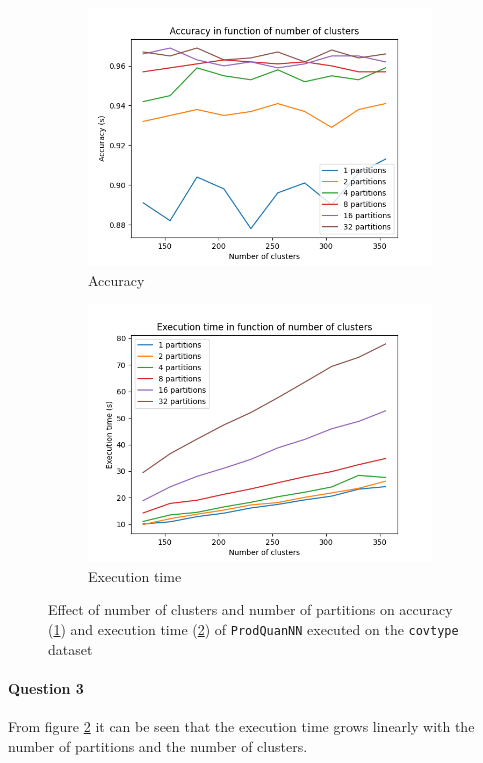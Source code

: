 \documentclass[10pt]{article}
\begin{document}
\vspace{-.4cm}
\begin{figure}[h]
	\begin{subfigure}{.5\textwidth}
		\includegraphics[width=\linewidth]{./img/Accuracy--covtype-hyp1-64--130-355.png}
		\caption{Accuracy}
		\label{fig:acc}
	\end{subfigure}%
	\hfill
	\begin{subfigure}{.5\textwidth}
		\includegraphics[width=\linewidth]{./img/Execution time--covtype-hyp1-64--130-355.png}
		\caption{Execution time}
		\label{fig:exec}
	\end{subfigure}
	\caption{Effect of number of clusters and number of partitions on accuracy (\ref{fig:acc}) and execution time (\ref{fig:exec}) of \texttt{ProdQuanNN} executed on the \texttt{covtype} dataset}
	\label{fig:hyperparams}
\end{figure}

\vspace{-.8cm}
\paragraph{Question 3} From figure \ref{fig:exec} it can be seen that the execution time grows linearly with the number of partitions and the number of clusters.
\end{document}
